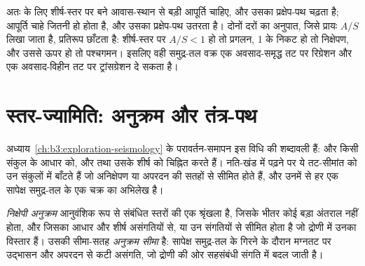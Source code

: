 अतः  के लिए शीर्ष-स्तर पर बने आवास-स्थान से बड़ी आपूर्ति चाहिए,
और उसका प्रक्षेप-पथ चढ़ता है;  आपूर्ति चाहे जितनी हो होता है,
और उसका प्रक्षेप-पथ उतरता है। दोनों दरों का अनुपात, जिसे प्रायः $A/S$ लिखा जाता है,
प्रतिरूप छाँटता है: शीर्ष-स्तर पर $A/S < 1$ हो तो प्रगलन, 1 के निकट हो तो निक्षेपण,
और उससे ऊपर हो तो पश्चगमन।
इसलिए वही समुद्र-तल वक्र एक अवसाद-समृद्ध तट पर रिग्रेशन
और एक अवसाद-विहीन तट पर ट्रांसग्रेशन दे सकता है।

\section{स्तर-ज्यामिति: अनुक्रम और तंत्र-पथ}\label{sec:b3:sequence-stratigraphy:sequences}

अध्याय~\ref{ch:b3:exploration-seismology} के परावर्तन-समापन इस विधि की शब्दावली हैं:
 और  किसी संकुल के आधार को,
और  तथा  उसके शीर्ष को चिह्नित करते हैं।
नति-खंड में पढ़ने पर ये तट-सीमांत को उन संकुलों में बाँटते हैं जो अनिक्षेपण या अपरदन की सतहों से सीमित होते हैं,
और उनमें से हर एक सापेक्ष समुद्र-तल के एक चक्र का अभिलेख है।

\begin{definition}[निक्षेपी अनुक्रम और अनुक्रम सीमा]\label{def:b3:sequence-stratigraphy:sequence}
\emph{निक्षेपी अनुक्रम} आनुवंशिक रूप से संबंधित स्तरों की एक श्रृंखला है,
जिसके भीतर कोई बड़ा अंतराल नहीं होता, और जिसका आधार और शीर्ष
असंगतियों से, या उन संगतियों से सीमित होता है जो द्रोणी में उनका विस्तार हैं।
उसकी सीमा-सतह \emph{अनुक्रम
सीमा} है: सापेक्ष समुद्र-तल के गिरने के दौरान मग्नतट पर उद्भासन
और अपरदन से कटी असंगति, जो द्रोणी की ओर
सहसंबंधी संगति में बदल जाती है।
\end{definition}

